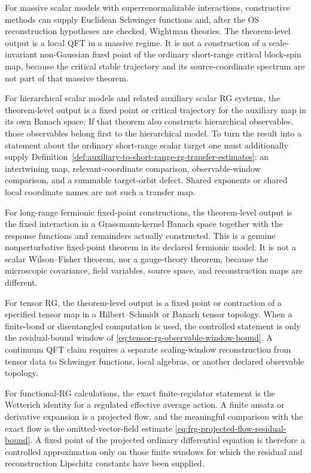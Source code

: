 For massive scalar models with superrenormalizable interactions, constructive
methods can supply Euclidean Schwinger functions and, after the OS
reconstruction hypotheses are checked, Wightman theories.  The theorem-level
output is a local QFT in a massive regime.  It is not a construction of a
scale-invariant non-Gaussian fixed point of the ordinary short-range critical
block-spin map, because the critical stable trajectory and its source-coordinate
spectrum are not part of that massive theorem.

For hierarchical scalar models and related auxiliary scalar RG systems, the
theorem-level output is a fixed point or critical trajectory for the auxiliary
map in its own Banach space.  If that theorem also constructs hierarchical
observables, those observables belong first to the hierarchical model.  To turn
the result into a statement about the ordinary short-range scalar target one
must additionally supply
Definition~\ref{def:auxiliary-to-short-range-rg-transfer-estimates}: an
intertwining map, relevant-coordinate comparison, observable-window comparison,
and a summable target-orbit defect.  Shared exponents or shared local
coordinate names are not such a transfer map.

For long-range fermionic fixed-point constructions, the theorem-level output is
the fixed interaction in a Grassmann-kernel Banach space together with the
response functions and remainders actually constructed.  This is a genuine
nonperturbative fixed-point theorem in its declared fermionic model.  It is not
a scalar Wilson--Fisher theorem, nor a gauge-theory theorem, because the
microscopic covariance, field variables, source space, and reconstruction maps
are different.

For tensor RG, the theorem-level output is a fixed point or contraction of a
specified tensor map in a Hilbert--Schmidt or Banach tensor topology.  When a
finite-bond or disentangled computation is used, the controlled statement is
only the residual-bound window of
\eqref{eq:tensor-rg-observable-window-bound}.  A continuum QFT claim requires a
separate scaling-window reconstruction from tensor data to Schwinger functions,
local algebras, or another declared observable topology.

For functional-RG calculations, the exact finite-regulator statement is the
Wetterich identity for a regulated effective average action.  A finite ansatz
or derivative expansion is a projected flow, and the meaningful comparison
with the exact flow is the omitted-vector-field estimate
\eqref{eq:frg-projected-flow-residual-bound}.  A fixed point of the projected
ordinary differential equation is therefore a controlled approximation only on
those finite windows for which the residual and reconstruction Lipschitz
constants have been supplied.

